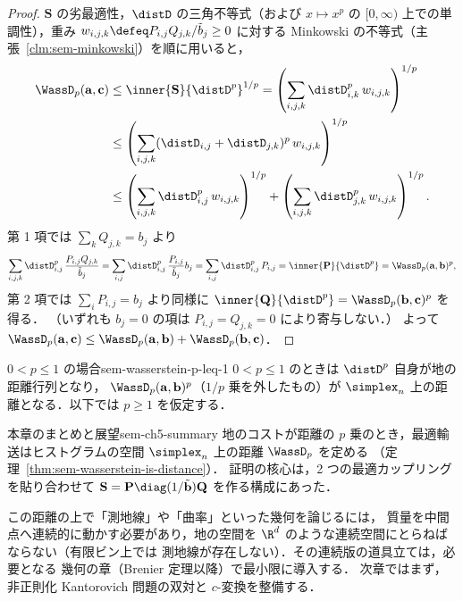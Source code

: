 \begin{proof}
  $\mathbf{S}$ の劣最適性，$\distD$ の三角不等式（および $x \mapsto x^p$ の
  $[0,\infty)$ 上での単調性），重み
  $w_{i,j,k} \defeq P_{i,j}Q_{j,k}/\tilde{b}_j \geq 0$ に対する
  Minkowski の不等式（主張~\ref{clm:sem-minkowski}）を順に用いると，
  \begin{align*}
    \WassD_p(\mathbf{a}, \mathbf{c})
    &\leq \inner{\mathbf{S}}{\distD^p}^{1/p}
     = \left(\sum_{i,j,k} \distD_{i,k}^p\, w_{i,j,k}\right)^{1/p} \\
    &\leq \left(\sum_{i,j,k}
        (\distD_{i,j} + \distD_{j,k})^p\, w_{i,j,k}\right)^{1/p} \\
    &\leq \left(\sum_{i,j,k} \distD_{i,j}^p\, w_{i,j,k}\right)^{1/p}
       + \left(\sum_{i,j,k} \distD_{j,k}^p\, w_{i,j,k}\right)^{1/p}.
  \end{align*}
  第 1 項では $\sum_k Q_{j,k} = b_j$ より
  \[
    \sum_{i,j,k} \distD_{i,j}^p\, \frac{P_{i,j}Q_{j,k}}{\tilde{b}_j}
    = \sum_{i,j} \distD_{i,j}^p\, \frac{P_{i,j}}{\tilde{b}_j} b_j
    = \sum_{i,j} \distD_{i,j}^p\, P_{i,j}
    = \inner{\mathbf{P}}{\distD^p}
    = \WassD_p(\mathbf{a}, \mathbf{b})^p,
  \]
  第 2 項では $\sum_i P_{i,j} = b_j$ より同様に
  $\inner{\mathbf{Q}}{\distD^p} = \WassD_p(\mathbf{b}, \mathbf{c})^p$ を得る．
  （いずれも $b_j = 0$ の項は $P_{i,j} = Q_{j,k} = 0$ により寄与しない．）
  よって
  $\WassD_p(\mathbf{a}, \mathbf{c})
  \leq \WassD_p(\mathbf{a}, \mathbf{b}) + \WassD_p(\mathbf{b}, \mathbf{c})$．
\end{proof}

\begin{remark}{$0 < p \leq 1$ の場合}{sem-wasserstein-p-leq-1}
  $0 < p \leq 1$ のときは $\distD^p$ 自身が地の距離行列となり，
  $\WassD_p(\mathbf{a}, \mathbf{b})^p$（$1/p$ 乗を外したもの）が
  $\simplex_n$ 上の距離となる．以下では $p \geq 1$ を仮定する．
\end{remark}

\begin{remark}{本章のまとめと展望}{sem-ch5-summary}
  地のコストが距離の $p$ 乗のとき，最適輸送はヒストグラムの空間
  $\simplex_n$ 上の距離 $\WassD_p$ を定める
  （定理~\ref{thm:sem-wasserstein-is-distance}）．
  証明の核心は，2 つの最適カップリングを貼り合わせて
  $\mathbf{S} = \mathbf{P}\diag(1/\tilde{\mathbf{b}})\mathbf{Q}$ を作る構成にあった．

  この距離の上で「測地線」や「曲率」といった幾何を論じるには，
  質量を中間点へ連続的に動かす必要があり，地の空間を
  $\R^d$ のような連続空間にとらねばならない（有限ビン上では
  測地線が存在しない）．その連続版の道具立ては，必要となる
  幾何の章（Brenier 定理以降）で最小限に導入する．
  次章ではまず，非正則化 Kantorovich 問題の双対と $c$-変換を整備する．
\end{remark}
